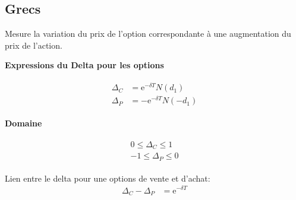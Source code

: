 \documentclass[10pt, french]{article}
\begin{document}
\begin{multicols*}{2}
\columnbreak

\subsection{Grecs}

\begin{definitionNOHFILL}[Delta $\Delta	=	\deriv{S_{0}}{V}$]
Mesure la variation du prix de l'option correspondante à une augmentation du prix de l'action.

\tcbline

\begin{minipage}[ht]{0.5\linewidth}
\begin{center}
	\textbf{Expressions du Delta pour les options}
\end{center}
\begin{gather}
\begin{align*}
	\Delta_{C}
	&=	\textrm{e}^{-\delta T} N(d_{1})	\\
	\Delta_{P}
	&=	-\textrm{e}^{-\delta T} N(-d_{1})	
\end{align*}
\end{gather}
\end{minipage}
\begin{minipage}[ht]{0.5\linewidth}
\begin{center}
	\textbf{Domaine}
\end{center}
\begin{gather}
\begin{align*}
	0 \le \Delta_{C} \le 1	\\
	-1 \le \Delta_{P} \le 0	
\end{align*}
\end{gather}
\end{minipage}

\tcbline
Lien entre le delta pour une options de vente et d'achat:
\begin{align*}
	\Delta_{C} - \Delta_{P}	&=	\textrm{e}^{-\delta T}
\end{align*}


\end{definitionNOHFILL}
\end{multicols*}
\end{document}
